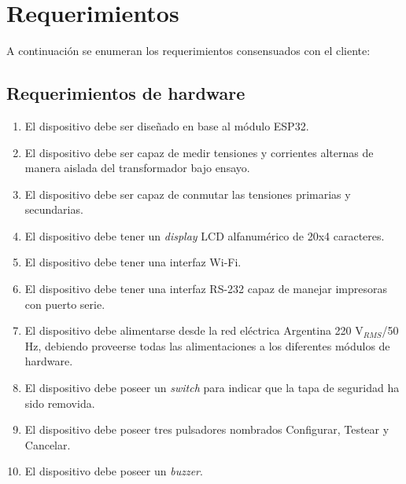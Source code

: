\section{Requerimientos}

A continuación se enumeran los requerimientos consensuados con el cliente:

\subsection{Requerimientos de hardware}
	\begin{enumerate}
	\item El dispositivo debe ser diseñado en base al módulo ESP32.
	\item El dispositivo debe ser capaz de medir tensiones y corrientes alternas de manera aislada del transformador bajo ensayo.
	\item El dispositivo debe ser capaz de conmutar las tensiones primarias y secundarias.
	\item El dispositivo debe tener un \textit{display} LCD alfanumérico de 20x4 caracteres.
	\item El dispositivo debe tener una interfaz Wi-Fi.
	\item El dispositivo debe tener una interfaz RS-232 capaz de manejar impresoras con puerto serie.
	\item El dispositivo debe alimentarse desde la red eléctrica Argentina 220 V$_{RMS}$/50 Hz, debiendo proveerse todas las alimentaciones a los diferentes módulos de hardware.
	\item El dispositivo debe poseer un \textit{switch} para indicar que la tapa de seguridad ha sido removida.
	\item El dispositivo debe poseer tres pulsadores nombrados Configurar, Testear y Cancelar.
	\item El dispositivo debe poseer un \textit{buzzer}.
	\end{enumerate}
